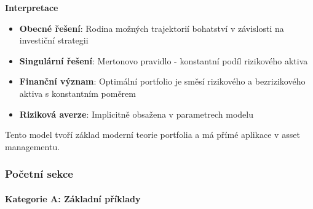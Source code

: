 \begin{example}
\vspace{1.5\baselineskip}

\noindent\textbf{Interpretace}
\begin{itemize}
\item \textbf{Obecné řešení}: Rodina možných trajektorií bohatství v závislosti na investiční strategii
\item \textbf{Singulární řešení}: Mertonovo pravidlo - konstantní podíl rizikového aktiva
\item \textbf{Finanční význam}: Optimální portfolio je směsí rizikového a bezrizikového aktiva s konstantním poměrem
\item \textbf{Riziková averze}: Implicitně obsažena v parametrech modelu
\end{itemize}
Tento model tvoří základ moderní teorie portfolia a má přímé aplikace v asset managementu.

\end{example}


\subsubsection{Početní sekce}
\paragraph*{Kategorie A: Základní příklady}

